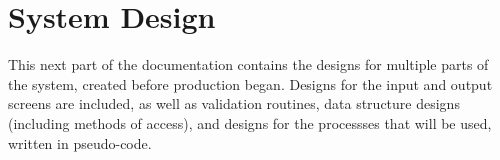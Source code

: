 \part{System Design}
This next part of the documentation contains the designs for multiple parts of the system, created before production began. Designs for the input and output screens are included, as well as validation routines, data structure designs (including methods of access), and designs for the processses that will be used, written in pseudo-code.


